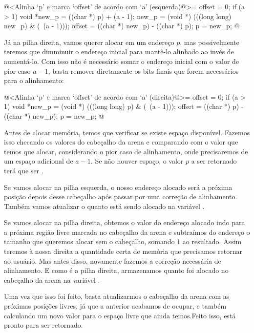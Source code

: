 \iniciocodigo
@<Alinha `p' e marca `offset' de acordo com `a' (esquerda)@>=
offset = 0;
if (a > 1){
  void *new_p = ((char *) p) + (a - 1);
  new_p = (void *) (((long long) new_p) & (~(a - 1)));
  offset = ((char *) new_p) - ((char *) p);
  p = new_p;
}
@
\fimcodigo

Já na pilha direita, vamos querer alocar em um endereço $p$, mas
possivelmente teremos que dimminuir o endereço inicial para mantê-lo
alinhado ao invés de aumentá-lo. Com isso não é necessário somar
o endereço inicial com o valor de pior caso $a-1$, basta remover
diretamente os bits finais que forem necessários para o alinhamento:

\iniciocodigo
@<Alinha `p' e marca `offset' de acordo com `a' (direita)@>=
offset = 0;
if (a > 1){
  void *new_p = (void *) (((long long) p) & (~(a - 1)));
  offset = ((char *) p) - ((char *) new_p);
  p = new_p;
}
@
\fimcodigo


Antes de alocar memória, temos que verificar se existe espaço
disponível. Fazemos isso checando os valores do cabeçalho da arena
e comparando com o valor que temos que alocar, considerando o pior
caso de alinhamento, onde precisaremos de um espaço adicional de
$a-1$. Se não houver espaço, o valor $p$ a ser retornado terá que ser
.

Se vamos alocar na pilha esquerda, o nosso endereço alocado será a
próxima posição depois desse cabeçalho após passar por uma correção de
alinhamento. Também vamos atualizar o quanto está sendo alocado na
variável .

Se vamos alocar na pilha direita, obtemos o valor do endereço alocado
indo para a próxima região livre marcada no cabeçalho da arena e
subtraímos do endereço o tamanho que queremos alocar sem o cabeçalho,
somando 1 ao resultado. Assim teremos à nossa direita a quantidade
certa de memória que precisamos retornar ao usuário. Mas antes disso,
novamente fazemos a correção necessária de alinhamento. E como é a
pilha direita, armazenamos quanto foi alocado no cabeçalho da arena na
variável .

Uma vez que isso foi feito, basta atualizarmos o cabeçalho da arena
com as próximas posições livres, já que a anterior acabamos de ocupar,
e também calculando um novo valor para o espaço livre que ainda
temos.Feito isso,
 está pronto para ser retornado.

